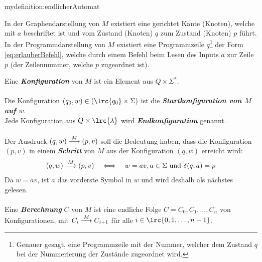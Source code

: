 \begin{mydefinition}{mydefinition:endlicherAutomat}
\begin{enumerate}[label=(\roman*)]
{		      In der Graphendarstellung von $M$ existiert eine gerichtet Kante (Knoten), welche mit $a$ beschriftet ist und vom Zustand (Knoten) $q$ zum Zustand (Knoten) $p$ führt. In der Programmdarstellung von $M$ existiert eine Programmzeile $q$\footnote{Genauer gesagt, eine Programmzeile mit der Nummer, welcher dem Zustand $q$ bei der Nummerierung der Zustände zugeordnet wird.} der Form \cref{eq:erlauberBefehl}, welche durch einem  Befehl beim Lesen des Inputs $a$ zur Zeile $p$ (der Zeilennummer, welche $p$ zugeordnet ist).}
\end{enumerate}
\end{mydefinition}
\noindent
Eine \textit{\textbf{Konfiguration}} von $M$ ist ein Element aus $Q\times \Sigma^*$.\\
\\

\noindent
Die Konfiguration $(q_0,w)\in (\lrc{q_0}\times \Sigma)$ ist die \textit{\textbf{Startkonfiguration von $M$ auf $w$}}.\\
\clearpage
\noindent
Jede Konfiguration aus $Q\times\lrc{\lambda}$ wird \textit{\textbf{Endkonfiguration}} genannt.\\
\\

\noindent
Der Ausdruck $(q,w)\overset{M}{\longrightarrow} (p,v)$ soll die Bedeutung haben, dass die Konfiguration $(p,v)$ in einem \textit{\textbf{Schritt}} von $M$ aus der Konfiguration $(q,w)$ erreicht wird:
\begin{align*}
	(q,w)\overset{M}{\longrightarrow} (p,v) \quad \Longleftrightarrow \quad w = av, a\in\Sigma\text{ und } \delta(q,a) = p
\end{align*}
Da $w = av$, ist $a$ das vorderste Symbol in $w$ und wird deshalb als nächstes gelesen.\\
\\

\noindent
Eine \textit{\textbf{Berechnung}} $C$ von $M$ ist eine endliche Folge $C = C_0, C_1, \ldots , C_n$ von Konfigurationen, mit $C_i\overset{M}{\longrightarrow} C_{i+1}$ für alle $i\in\lrc{0,1,\ldots , n-1}$.\\

